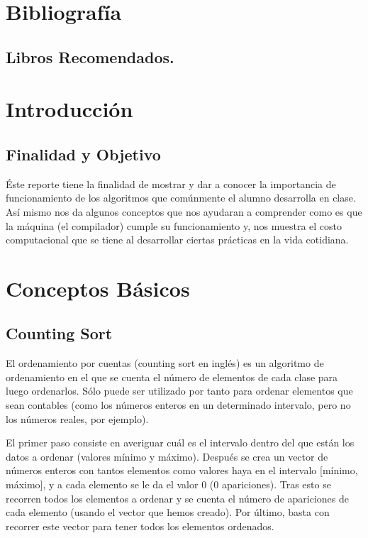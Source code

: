 \documentclass[a4paper]{article} %
\begin{document}
	\section{Bibliografía}
		\subsection{Libros Recomendados.}	
	
	
	\afterpage{\newpage}
	\newpage
	
	\section*{Introducción}
		\subsection*{Finalidad y Objetivo}		
		Éste reporte tiene la finalidad de mostrar y dar a conocer la importancia de funcionamiento de los algoritmos que 					comúnmente el alumno desarrolla en clase.\\ Así mismo nos da algunos conceptos que nos ayudaran a comprender como es que 			la máquina (el compilador) cumple su funcionamiento y, nos muestra el costo computacional que se tiene al desarrollar 				ciertas prácticas en la vida cotidiana.
		
	\section*{Conceptos Básicos}
		\subsection*{Counting Sort}
		El ordenamiento por cuentas (counting sort en inglés) es un algoritmo de ordenamiento en el que se cuenta el número de elementos de cada clase para luego ordenarlos. Sólo puede ser utilizado por tanto para ordenar elementos que sean contables (como los números enteros en un determinado intervalo, pero no los números reales, por ejemplo).

El primer paso consiste en averiguar cuál es el intervalo dentro del que están los datos a ordenar (valores mínimo y máximo). Después se crea un vector de números enteros con tantos elementos como valores haya en el intervalo [mínimo, máximo], y a cada elemento se le da el valor 0 (0 apariciones). Tras esto se recorren todos los elementos a ordenar y se cuenta el número de apariciones de cada elemento (usando el vector que hemos creado). Por último, basta con recorrer este vector para tener todos los elementos ordenados.
\end{document}
